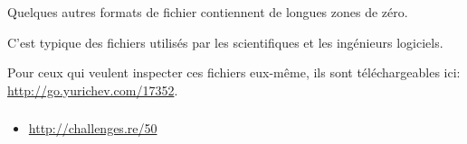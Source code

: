 Quelques autres formats de fichier contiennent de longues zones de zéro.

C'est typique des fichiers utilisés par les scientifiques et les ingénieurs logiciels.

Pour ceux qui veulent inspecter ces fichiers eux-même, ils sont téléchargeables ici:
\url{http://go.yurichev.com/17352}.

\subsubsection{\Exercise}

\begin{itemize}
	\item \url{http://challenges.re/50}
\end{itemize}

